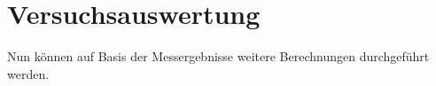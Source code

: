 \section{Versuchsauswertung}

Nun können auf Basis der Messergebnisse weitere Berechnungen durchgeführt werden.



